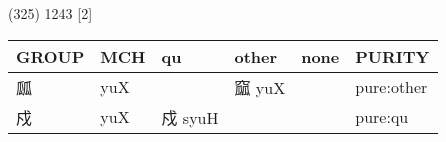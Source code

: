 \documentclass[14pt,a4paper]{scrartcl}
\begin{document}
(325) 1243 {[}2{]}

\begin{longtable}[c]{@{}llllll@{}}
\toprule
\begin{minipage}[b]{0.14\columnwidth}\raggedright\strut
GROUP
\strut\end{minipage} &
\begin{minipage}[b]{0.14\columnwidth}\raggedright\strut
MCH
\strut\end{minipage} &
\begin{minipage}[b]{0.14\columnwidth}\raggedright\strut
qu
\strut\end{minipage} &
\begin{minipage}[b]{0.14\columnwidth}\raggedright\strut
other
\strut\end{minipage} &
\begin{minipage}[b]{0.14\columnwidth}\raggedright\strut
none
\strut\end{minipage} &
\begin{minipage}[b]{0.14\columnwidth}\raggedright\strut
PURITY
\strut\end{minipage}\tabularnewline
\midrule
\endhead
\begin{minipage}[t]{0.14\columnwidth}\raggedright\strut
㼌
\strut\end{minipage} &
\begin{minipage}[t]{0.14\columnwidth}\raggedright\strut
yuX
\strut\end{minipage} &
\begin{minipage}[t]{0.14\columnwidth}\raggedright\strut
\strut\end{minipage} &
\begin{minipage}[t]{0.14\columnwidth}\raggedright\strut
窳 yuX
\strut\end{minipage} &
\begin{minipage}[t]{0.14\columnwidth}\raggedright\strut
\strut\end{minipage} &
\begin{minipage}[t]{0.14\columnwidth}\raggedright\strut
pure:other
\strut\end{minipage}\tabularnewline
\begin{minipage}[t]{0.14\columnwidth}\raggedright\strut
戍
\strut\end{minipage} &
\begin{minipage}[t]{0.14\columnwidth}\raggedright\strut
yuX
\strut\end{minipage} &
\begin{minipage}[t]{0.14\columnwidth}\raggedright\strut
戍 syuH
\strut\end{minipage} &
\begin{minipage}[t]{0.14\columnwidth}\raggedright\strut
\strut\end{minipage} &
\begin{minipage}[t]{0.14\columnwidth}\raggedright\strut
\strut\end{minipage} &
\begin{minipage}[t]{0.14\columnwidth}\raggedright\strut
pure:qu
\strut\end{minipage}\tabularnewline
\bottomrule
\end{longtable}
\end{document}
